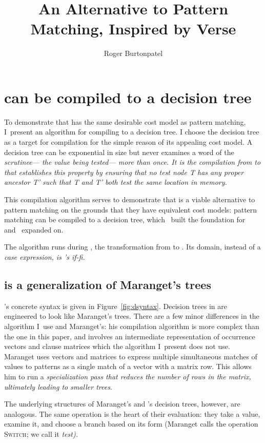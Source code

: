 \documentclass[manuscript,screen,review, 12pt, nonacm]{acmart}
\title{An Alternative to Pattern Matching, Inspired by Verse}
\author{Roger Burtonpatel}
\affiliation{%
\institution{Tufts University}
\streetaddress{419 Boston Ave}
  \city{Medford}
  \state{Massachusetts}
  \country{USA}
  \postcode{02155}
  }
\begin{document}
  

\section{\VMinus can be compiled to a decision tree}
\label{vminustod}
    To demonstrate that \VMinus has the same desirable cost model as pattern
    matching, I~present an algorithm for compiling \VMinus to a decision tree. I
    choose the decision tree as a target for compilation for the simple reason
    of its appealing cost model. A decision tree can be exponential in size but
    never examines a word of the \it{scrutinee}--- the value being tested---
    more than once. It is the compilation from \VMinus to \D that establishes
    this property by ensuring that no \it{test} node \it{T} has any proper
    ancestor \it{T'} such that \it{T} and \it{T'} both test the same location in
    memory.   

    This compilation algorithm serves to demonstrate that \VMinus is a viable
    alternative to pattern matching on the grounds that they have equivalent
    cost models: pattern matching can be compiled to a decision tree,
    which~\citet{macqueen1985tree} built the foundation for and~\citet{maranget}
    expanded on. 

    The algorithm runs during \DTran, the transformation from \VMinus to \D. Its
    domain, instead of a \it{case} expression, is \VMinus's \it{if-fi}. 
       
    \subsection{\D is a generalization of Maranget's trees} 

  \D's concrete syntax is given in Figure~\ref{fig:dsyntax}. Decision trees in \D
    are engineered to look like Maranget's trees. There are a few minor
    differences in the algorithm I~use and Maranget's: his compilation algorithm
    is more complex than the one in this paper, and involves an intermediate
    representation of occurrence vectors and clause matrices which the algorithm
    I~present does not use. Maranget uses vectors and matrices to express
    multiple simultaneous matches of values to patterns as a single match of a
    vector with a matrix row. This allows him to run a \it{specialization} pass
    that reduces the number of rows in the matrix, ultimately leading to smaller
    trees.
    
        
    The underlying structures of Maranget's and \D's decision trees, however,
    are analogous. The same operation is the heart of their evaluation: they
    take a value, examine it, and choose a branch based on its form (Maranget
    calls the operation \textsc{Switch}; we call it \it{test}). 
\end{document}
